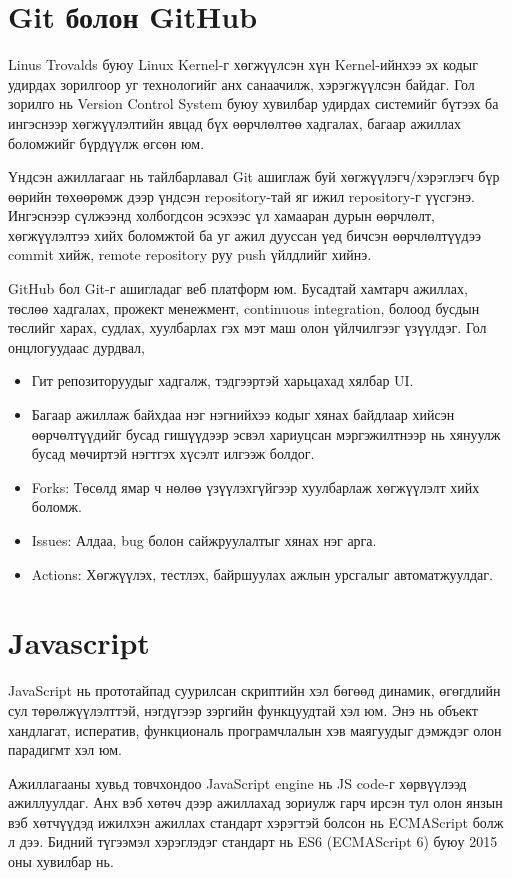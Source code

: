 \section{Git болон GitHub}
Linus Trovalds буюу Linux Kernel-г хөгжүүлсэн хүн Kernel-ийнхээ эх кодыг удирдах зорилгоор уг технологийг анх санаачилж, хэрэгжүүлсэн байдаг. Гол зорилго нь Version Control System буюу хувилбар удирдах системийг бүтээх ба ингэснээр хөгжүүлэлтийн явцад бүх өөрчлөлтөө хадгалах, багаар ажиллах боломжийг бүрдүүлж өгсөн юм.

Үндсэн ажиллагааг нь тайлбарлавал Git ашиглаж буй хөгжүүлэгч/хэрэглэгч бүр өөрийн төхөөрөмж дээр үндсэн repository-тай яг ижил repository-г үүсгэнэ. Ингэснээр сүлжээнд холбогдсон эсэхээс үл хамааран дурын өөрчлөлт, хөгжүүлэлтээ хийх боломжтой ба уг ажил дууссан үед бичсэн өөрчлөлтүүдээ commit хийж, remote repository руу push үйлдлийг хийнэ.

GitHub бол Git-г ашигладаг веб платформ юм. Бусадтай хамтарч ажиллах, төслөө хадгалах, прожект менежмент, continuous integration, болоод бусдын төслийг харах, судлах, хуулбарлах гэх мэт маш олон үйлчилгээг үзүүлдэг. Гол онцлогуудаас дурдвал,

\begin{itemize}
	\item Гит репозиторуудыг хадгалж, тэдгээртэй харьцахад хялбар UI.
	\item Багаар ажиллаж байхдаа нэг нэгнийхээ кодыг хянах байдлаар хийсэн өөрчөлтүүдийг бусад гишүүдээр эсвэл хариуцсан мэргэжилтнээр нь хянуулж бусад мөчиртэй нэгтгэх хүсэлт илгээж болдог.
	\item Forks: Төсөлд ямар ч нөлөө үзүүлэхгүйгээр хуулбарлаж хөгжүүлэлт хийх боломж.
	\item Issues: Алдаа, bug болон сайжруулалтыг хянах нэг арга.
	\item Actions: Хөгжүүлэх, тестлэх, байршуулах ажлын урсгалыг автоматжуулдаг.
\end{itemize}

\section{Javascript}
\quad JavaScript нь прототайпад суурилсан скриптийн хэл бөгөөд динамик, өгөгдлийн сул төрөлжүүлэлттэй, нэгдүгээр зэргийн функцуудтай хэл юм. Энэ нь объект хандлагат, исператив, функциональ програмчлалын хэв маягуудыг дэмждэг олон парадигмт хэл юм.

Ажиллагааны хувьд товчхондоо JavaScript engine нь JS code-г хөрвүүлээд ажиллуулдаг. Анх вэб хөтөч дээр ажиллахад зориулж гарч ирсэн тул олон янзын вэб хөтчүүдэд ижилхэн ажиллах стандарт хэрэгтэй болсон нь ECMAScript болж л дээ. Бидний түгээмэл хэрэглэдэг стандарт нь ES6 (ECMAScript 6) буюу 2015 оны хувилбар нь.

